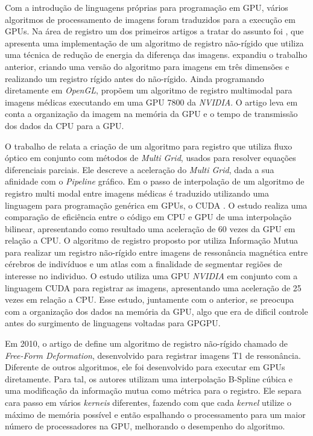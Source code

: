 	Com a introdução de linguagens próprias para programação em GPU, vários algoritmos de processamento de imagens foram
traduzidos para a execução em GPUs. Na área de registro um dos primeiros artigos a tratar do assunto foi 
\cite{strzodka2004image}, que apresenta uma implementação de um algoritmo de registro não-rígido que utiliza uma técnica
de redução de energia da diferença das imagens. \cite{kohn2006gpu} expandiu o trabalho anterior, criando uma versão do 
algoritmo para imagens em três dimensões e realizando um registro rígido antes do não-rígido. Ainda programando 
diretamente em \textit{OpenGL}, \cite{vetter2007non} propõem um algoritmo de registro multimodal para imagens médicas 
executando em uma GPU 7800 da \textit{NVIDIA}. O artigo leva em conta a organização da imagem na memória da GPU e o 
tempo de transmissão dos dados da CPU para a GPU.

	O trabalho de \cite{grossauer2008gpu} relata a criação de um algoritmo para registro que utiliza fluxo óptico em 
conjunto com métodos de \textit{Multi Grid}, usados para resolver equações diferenciais parciais. Ele descreve
a aceleração do \textit{Multi Grid}, dada a sua afinidade com o \textit{Pipeline} gráfico. Em \cite{bui2009performance}
o passo de interpolação de um algoritmo de registro multi modal entre imagens médicas é traduzido utilizando uma 
linguagem para programação genérica em GPUs, o CUDA \cite{nvidia2007compute}. O estudo realiza uma comparação de 
eficiência entre o código em CPU e GPU de uma interpolação bilinear, apresentando como resultado uma aceleração de 60 
vezes da GPU em relação a CPU. O algoritmo de registro proposto por \cite{han2009gpu} utiliza Informação Mutua para
realizar um registro não-rígido entre imagens de ressonância magnética entre cérebros de indivíduos e um atlas com a 
finalidade de segmentar regiões de interesse no individuo. O estudo utiliza uma GPU \textit{NVIDIA} em conjunto com a 
linguagem CUDA para registrar as imagens, apresentando uma aceleração de 25 vezes em relação a CPU. Esse estudo, 
juntamente com o anterior, se preocupa com a organização dos dados na memória da GPU, algo que era de dificil controle 
antes do surgimento de linguagens voltadas para GPGPU.

	Em 2010, o artigo de \cite{modat2010fast} define um algoritmo de registro não-rígido chamado de \textit{Free-Form 
Deformation}, desenvolvido para registrar imagens T1 de ressonância. Diferente de outros algoritmos, ele foi desenvolvido
para executar em GPUs diretamente. Para tal, os autores utilizam uma interpolação B-Spline cúbica e uma modificação da
informação mutua como métrica para o registro. Ele separa cara passo em vários \textit{kerneis} diferentes, fazendo
com que cada \textit{kernel} utilize o máximo de memória possível e então espalhando o processamento para um maior número
de processadores na GPU, melhorando o desempenho do algoritmo. 

